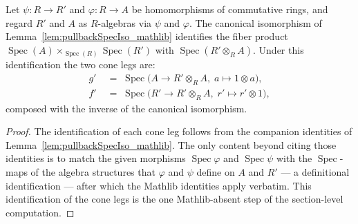\begin{lemma}




  \label{lem:pullback_fst_snd_specMap_tensor}
  Let \(\psi : R \to R'\) and \(\varphi : R \to A\) be homomorphisms of commutative
  rings, and regard \(R'\) and \(A\) as \(R\)-algebras via \(\psi\) and \(\varphi\).
  The canonical isomorphism of Lemma~\ref{lem:pullbackSpecIso_mathlib} identifies the
  fiber product \(\operatorname{Spec}(A) \times_{\operatorname{Spec}(R)}
  \operatorname{Spec}(R')\) with \(\operatorname{Spec}(R' \otimes_R A)\). Under this
  identification the two cone legs are:
  \begin{align*}
    g' &\;=\; \operatorname{Spec}\bigl(A \to R' \otimes_R A,\; a \mapsto 1 \otimes a\bigr),\\
    f' &\;=\; \operatorname{Spec}\bigl(R' \to R' \otimes_R A,\; r' \mapsto r' \otimes 1\bigr),
  \end{align*}
  composed with the inverse of the canonical isomorphism.
\end{lemma}

\begin{proof}
  The identification of each cone leg follows from the companion identities of
  Lemma~\ref{lem:pullbackSpecIso_mathlib}. The only content beyond citing those
  identities is to match the given morphisms \(\operatorname{Spec}\varphi\) and
  \(\operatorname{Spec}\psi\) with the \(\operatorname{Spec}\)-maps of the algebra
  structures that \(\varphi\) and \(\psi\) define on \(A\) and \(R'\) — a definitional
  identification — after which the Mathlib identities apply verbatim. This identification
  of the cone legs is the one Mathlib-absent step of the section-level computation.
\end{proof}

